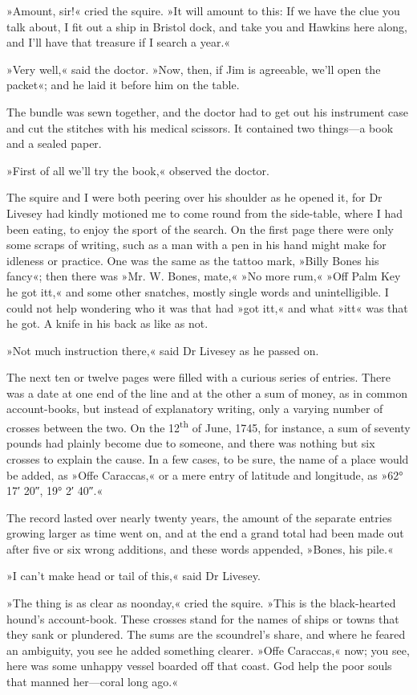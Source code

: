 »Amount, sir!« cried the squire. »It will amount to this: If we have the clue you talk about, I fit out a ship in Bristol dock, and take you and Hawkins here along, and I'll have that treasure if I search a year.«

»Very well,« said the doctor. »Now, then, if Jim is agreeable, we'll open the packet«; and he laid it before him on the table.

The bundle was sewn together, and the doctor had to get out his instrument case and cut the stitches with his medical scissors. It contained two things—a book and a sealed paper.

»First of all we'll try the book,« observed the doctor.

The squire and I were both peering over his shoulder as he opened it, for Dr Livesey had kindly motioned me to come round from the side-table, where I had been eating, to enjoy the sport of the search. On the first page there were only some scraps of writing, such as a man with a pen in his hand might make for idleness or practice. One was the same as the tattoo mark, »Billy Bones his fancy«; then there was »Mr. W. Bones, mate,« »No more rum,« »Off Palm Key he got itt,« and some other snatches, mostly single words and unintelligible. I could not help wondering who it was that had »got itt,« and what »itt« was that he got. A knife in his back as like as not.

»Not much instruction there,« said Dr Livesey as he passed on.

The next ten or twelve pages were filled with a curious series of entries. There was a date at one end of the line and at the other a sum of money, as in common account-books, but instead of explanatory writing, only a varying number of crosses between the two. On the 12\textsuperscript{th} of June, 1745, for instance, a sum of seventy pounds had plainly become due to someone, and there was nothing but six crosses to explain the cause. In a few cases, to be sure, the name of a place would be added, as »Offe Caraccas,« or a mere entry of latitude and longitude, as »62° 17′ 20″, 19° 2′ 40″.«

The record lasted over nearly twenty years, the amount of the separate entries growing larger as time went on, and at the end a grand total had been made out after five or six wrong additions, and these words appended, »Bones, his pile.«

»I can't make head or tail of this,« said Dr Livesey.

»The thing is as clear as noonday,« cried the squire. »This is the black-hearted hound's account-book. These crosses stand for the names of ships or towns that they sank or plundered. The sums are the scoundrel's share, and where he feared an ambiguity, you see he added something clearer. »Offe Caraccas,« now; you see, here was some unhappy vessel boarded off that coast. God help the poor souls that manned her—coral long ago.«

